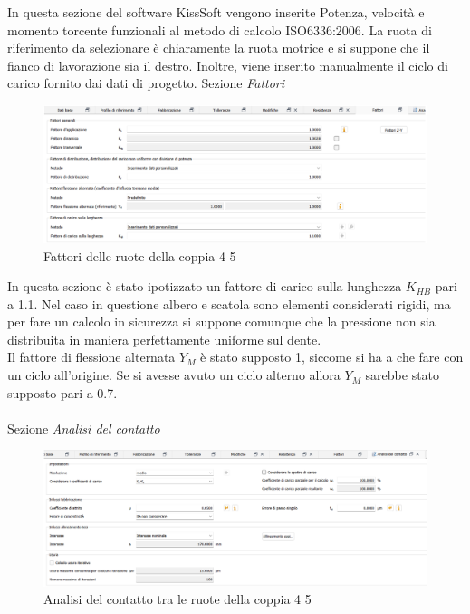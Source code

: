 In questa sezione del software KissSoft vengono inserite Potenza, velocità e momento torcente funzionali al metodo di calcolo ISO6336:2006. La ruota di riferimento da selezionare è chiaramente la ruota motrice e si suppone che il fianco di lavorazione sia il destro. Inoltre, viene inserito manualmente il ciclo di carico fornito dai dati di progetto.
\newpage
Sezione \emph{Fattori}
\begin{figure}[h]
    \centering
    \includegraphics[scale=0.4]{Immagini/FattoriCoppia45.png}
    \caption{Fattori delle ruote della coppia 4 5}
    \label{fig:FattoriCoppia45}
\end{figure}

In questa sezione è stato ipotizzato un fattore di carico sulla lunghezza $K_{HB}$ pari a 1.1. Nel caso in questione albero e scatola sono elementi considerati rigidi, ma per fare un calcolo in sicurezza si suppone comunque che la pressione non sia distribuita in maniera perfettamente uniforme sul dente.\\
Il fattore di flessione alternata $Y_M$ è stato supposto 1, siccome si ha a che fare con un ciclo all’origine. Se si avesse avuto un ciclo alterno allora $Y_M$ sarebbe stato supposto pari a 0.7.\\
\\
Sezione \emph{Analisi del contatto}
\begin{figure}[h]
    \centering
    \includegraphics[scale=0.5]{Immagini/AnalisiContattoCoppia45.png}
    \caption{Analisi del contatto tra le ruote della coppia 4 5}
    \label{fig:AnalisiContattoCoppia45}
\end{figure}

